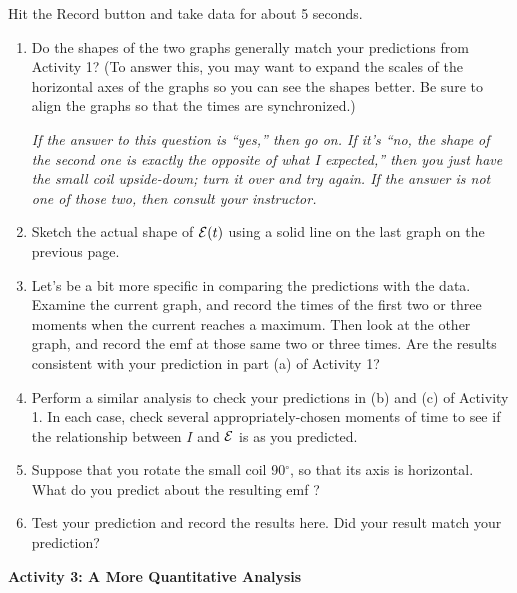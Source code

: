 Hit the Record button and take data for about 5 seconds.  

\begin{enumerate}[labparts]
\item Do the shapes of the
two graphs generally match your predictions from Activity 1? (To answer this, you may want to expand the scales of the horizontal axes of the graphs so you can see the shapes better.  Be sure to align the graphs so that the times are synchronized.) 

\answerspace{1in}

\textit{If the answer to this question is ``yes,'' then go on.  If it's ``no,
the shape of the second one is exactly the opposite of what I expected,''
then you just have the small coil upside-down; turn it over and 
try again.  If the answer is not one of those two, then consult your 
instructor.}

\item  Sketch the actual shape of ${\cal E}(t)$ using a solid line on the last graph on the previous page.
\medskip

\item  Let's be a bit more specific in comparing the predictions
with the data.  Examine the current graph, and record the
times of the first two or three moments when the current reaches a maximum.
Then look at the other graph, and record the emf at those same two or three times.
Are the results consistent with your prediction in part (a) of Activity 1?

\answerspace{0.9in}

\item  Perform a similar analysis to check your predictions in (b) and (c) of Activity 1.
In each case, check several appropriately-chosen moments of time to see
if the relationship between $I$ and ${\cal E}$ is as you predicted.

\answerspace{1in}

\item  Suppose that you rotate the small coil 90$^\circ$, so that its axis
is horizontal.  What do you predict about the resulting emf ?
\answerspace{0.8in}

\item  Test your prediction and record the results here.  Did your result match your prediction?
\answerspace{0.8in}
\end{enumerate}

\pagebreak[2]

\textbf{Activity 3: A More Quantitative Analysis}


